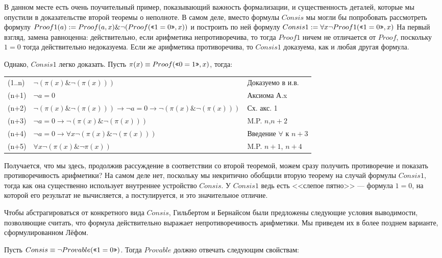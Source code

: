 В данном месте есть очень поучительный пример, показывающий важность 
формализации, и существенность деталей, которые мы опустили в доказательстве
второй теоремы о неполноте. В самом деле, вместо формулы $Consis$ мы могли бы 
попробовать рассмотреть формулу 
$Proof1(a) := Proof (a,x) \& \neg(Proof (\texttt{<<}1=0\texttt{>>},x))$
и построить по ней формулу
$Consis1 := \forall x \neg Proof1 (\texttt{<<}1=0\texttt{>>},x)$ 
На первый взгляд, замена равноценна: действительно, 
если арифметика непротиворечива, то тогда $Proof1$ ничем не отличается от $Proof$,
поскольку $1=0$ тогда действительно недоказуема. Если же арифметика противоречива,
то $Consis1$ доказуема, как и любая другая формула.

Однако, $Consis1$ легко доказать. Пусть $\pi(x) \equiv Proof(\texttt{<<}0=1\texttt{>>},x)$, тогда:

\begin{tabular}{lll}
(1..n) & $\neg (\pi(x) \& \neg (\pi(x)))$ & Доказуемо в и.в.\\
(n+1) & $\neg a=0$ & Аксиома А.x\\
(n+2) & $\neg (\pi(x) \& \neg (\pi(x))) \rightarrow \neg a=0 \rightarrow \neg (\pi(x) \& \neg (\pi(x)))$ & Сх. акс. 1\\
(n+3) & $\neg a=0 \rightarrow \neg (\pi(x) \& \neg (\pi(x)))$ & M.P. $n$,$n+2$\\
(n+4) & $\neg a=0 \rightarrow \forall x \neg (\pi(x) \& \neg (\pi(x)))$ & Введение $\forall$ к $n+3$\\
(n+5) & $\forall x \neg (\pi(x) \& \neg \pi(x))$ & M.P. $n+1$, $n+4$
\end{tabular}

Получается, что мы здесь, продолжив рассуждение в соответствии со второй теоремой,
можем сразу получить противоречие и показать противоречивость арифметики?
На самом деле нет, поскольку мы некритично обобщили вторую теорему на 
случай формулы $Consis1$, тогда как она существенно использует внутреннее устройство $Consis$. 
У $Consis1$ ведь есть <<слепое пятно>> --- формула $1=0$, на которой его результат не вычисляется,
а постулируется, и это значительное отличие. 

Чтобы абстрагироваться от конкретного вида $Consis$, Гильбертом и Бернайсом были
предложены следующие условия выводимости, позволяющие считать, что формула действительно
выражает непротиворечивость арифметики. Мы приведем их в более позднем варианте,
сформулированном Лёфом.

Пусть $Consis \equiv \neg Provable (\texttt{<<}1=0\texttt{>>})$. Тогда $Provable$ должно отвечать следующим
свойствам:

